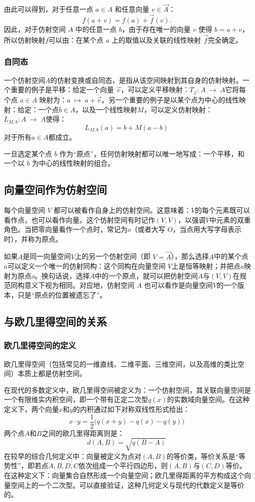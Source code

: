 由此可以得到，对于任意一点 $a \in A$ 和任意向量 $v \in \overrightarrow{A}$：
$$
f(a + v) = f(a) + \overrightarrow{f}(v).~
$$
因此，对于仿射空间 $A$ 中的任意一点 $b$，由于存在唯一的向量 $v$ 使得 $b = a + v$，所以仿射映射$f$可以由：在某个点 $a$ 上的取值以及关联的线性映射 $\overrightarrow{f}$完全确定。
\subsubsection{自同态}
一个仿射空间$A$的仿射变换或自同态，是指从该空间映射到其自身的仿射映射。一个重要的例子是平移：给定一个向量 $\overrightarrow{v}$，可以定义平移映射：$T_{\overrightarrow{v}}: A \;\longrightarrow\; A$它将每个点 $a \in A$ 映射为：$a \;\longmapsto\; a + \overrightarrow{v}$。另一个重要的例子是以某个点为中心的线性映射：给定：一个点$b \in A$，以及一个线性映射$M$，可以定义仿射映射：$L_{M,b}: A \;\longrightarrow\; A$使得：
$$
L_{M,b}(a) = b + M(a - b)~
$$
对于所有$a \in A$都成立。

一旦选定某个点 $b$ 作为“原点”，任何仿射映射都可以唯一地写成：一个平移，和一个以 $b$ 为中心的线性映射的组合。
\subsection{向量空间作为仿射空间}
每个向量空间 $V$ 都可以被看作自身上的仿射空间。这意味着：$V$的每个元素既可以看作点，也可以看作向量。这个仿射空间有时记作$(V, V)$，以强调$V$中元素的双重角色。当把零向量看作一个点时，常记为$o$（或者大写 $O$，当点用大写字母表示时），并称为原点。

如果$A$是同一向量空间$V$上的另一个仿射空间（即 $V = \overrightarrow{A}$），那么选择$A$中的某个点$a$可以定义一个唯一的仿射同构：这个同构在向量空间 $V$上是恒等映射；并把点$a$映射为原点$o$。换句话说，选择$A$中的一个原点，就可以把仿射空间$A$与$(V, V)$在规范同构意义下视为相同。对应地，仿射空间 $A$ 也可以看作是向量空间$V$的一个版本，只是“原点的位置被遗忘了”。
\subsection{与欧几里得空间的关系}
\subsubsection{欧几里得空间的定义}
欧几里得空间（包括常见的一维直线、二维平面、三维空间，以及高维的类比空间）本质上都是仿射空间。

在现代的多数定义中，欧几里得空间被定义为：一个仿射空间，其关联向量空间是一个有限维实内积空间，即一个带有正定二次型$q(x)$的实数域向量空间。在这种定义下，两个向量$x$和$y$的内积通过如下对称双线性形式给出：
$$
x \cdot y = \frac{1}{2} \big(q(x + y) - q(x) - q(y)\big)~
$$
两个点$A$和$B$之间的欧几里得距离则是：
$$
d(A, B) = \sqrt{q(B - A)}~
$$
在较早的综合几何定义中：向量被定义为点对$(A, B)$的等价类，等价关系是“等势性”，即若点$A, B, D, C$依次组成一个平行四边形，则$(A, B)$与$(C, D)$等价。在这种定义下：向量集合自然形成一个向量空间；欧几里得距离的平方构成这个向量空间上的一个二次型。可以直接验证，这种几何定义与现代的代数定义是等价的。
